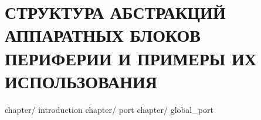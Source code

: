 \part{СТРУКТУРА АБСТРАКЦИЙ АППАРАТНЫХ БЛОКОВ ПЕРИФЕРИИ И ПРИМЕРЫ ИХ ИСПОЛЬЗОВАНИЯ}\label{module:op}
		
	{chapter/}	{introduction}					%
	{chapter/}	{port}							%
	{chapter/}	{global_port}					